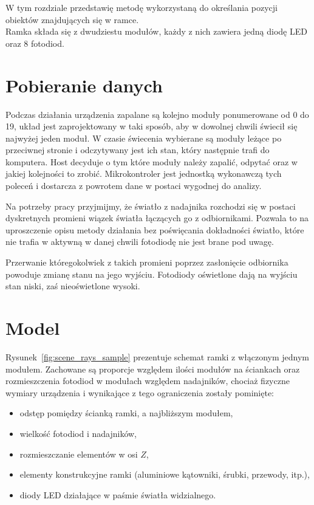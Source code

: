 \label{ch:method}

W tym rozdziale przedstawię metodę wykorzystaną do określania pozycji obiektów znajdujących się w ramce.\\

Ramka składa się z dwudziestu modułów, każdy z nich zawiera jedną diodę LED oraz 8 fotodiod.\\

\section{Pobieranie danych}

Podczas działania urządzenia zapalane są kolejno moduły ponumerowane od 0 do 19, układ jest zaprojektowany w taki sposób, aby w dowolnej chwili świecił się najwyżej jeden moduł. W czasie świecenia wybierane są moduły leżące po przeciwnej stronie i odczytywany jest ich stan, który następnie trafi do komputera. Host decyduje o tym które moduły należy zapalić, odpytać oraz w jakiej kolejności to zrobić. Mikrokontroler jest jednostką wykonawczą tych poleceń i dostarcza z powrotem dane w postaci wygodnej do analizy.

Na potrzeby pracy przyjmijmy, że światło z nadajnika rozchodzi się w postaci dyskretnych promieni \pauza wiązek światła łączących go z odbiornikami. Pozwala to na uproszczenie opisu metody działania bez poświęcania dokładności \pauza światło, które nie trafia w aktywną w danej chwili fotodiodę nie jest brane pod uwagę.

Przerwanie któregokolwiek z takich promieni poprzez zasłonięcie odbiornika powoduje zmianę stanu na jego wyjściu. Fotodiody oświetlone dają na wyjściu stan niski, zaś nieoświetlone \ppauza wysoki.\\

\section{Model}

Rysunek~\ref{fig:scene_rays_sample} prezentuje schemat ramki z włączonym jednym modułem. Zachowane są proporcje względem ilości modułów na ściankach oraz rozmieszczenia fotodiod w modułach względem nadajników, chociaż fizyczne wymiary urządzenia i wynikające z tego ograniczenia zostały pominięte:
\begin{itemize}
 \item odstęp pomiędzy ścianką ramki, a najbliższym modułem,
 \item wielkość fotodiod i nadajników,
 \item rozmieszczanie elementów w osi $Z$,
 \item elementy konstrukcyjne ramki (aluminiowe kątowniki, śrubki, przewody, itp.),
 \item diody LED działające w paśmie światła widzialnego.
\end{itemize}

